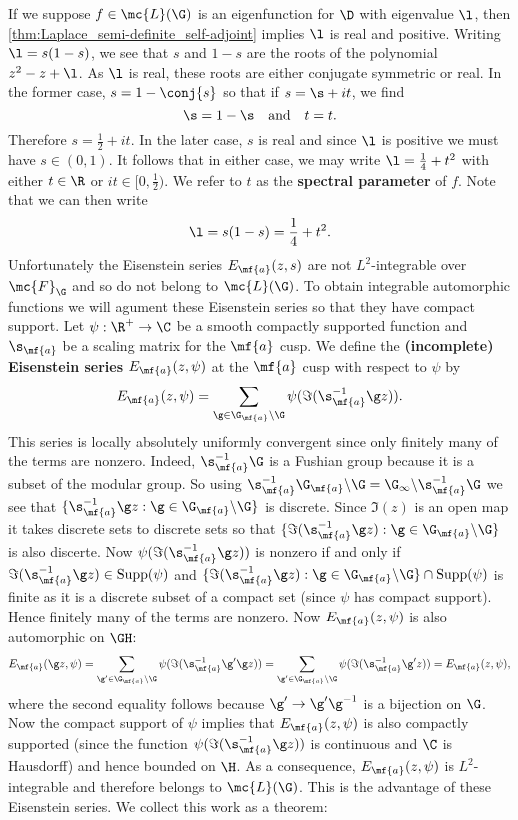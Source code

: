     If we suppose $f \in \mc{L}(\G)$ is an eigenfunction for $\D$ with eigenvalue $\l$, then \cref{thm:Laplace_semi-definite_self-adjoint} implies $\l$ is real and positive. Writing $\l = s(1-s)$, we see that $s$ and $1-s$ are the roots of the polynomial $z^{2}-z+\l$. As $\l$ is real, these roots are either conjugate symmetric or real. In the former case, $s = 1-\conj{s}$ so that if $s = \s+it$, we find
    \[
      \s = 1-\s \quad \text{and} \quad t = t.
    \]
    Therefore $s = \frac{1}{2}+it$. In the later case, $s$ is real and since $\l$ is positive we must have $s \in (0,1)$. It follows that in either case, we may write $\l = \frac{1}{4}+t^{2}$ with either $t \in \R$ or $it \in [0,\frac{1}{2})$. We refer to $t$ as the \textbf{spectral parameter} of $f$. Note that we can then write
    \[
      \l = s(1-s) = \frac{1}{4}+t^{2}.
    \]
    Unfortunately the Eisenstein series $E_{\mf{a}}(z,s)$ are not $L^{2}$-integrable over $\mc{F}_{\G}$ and so do not belong to $\mc{L}(\G)$. To obtain integrable automorphic functions we will agument these Eisenstein series so that they have compact support. Let $\psi:\R^{+} \to \C$ be a smooth compactly supported function and $\s_{\mf{a}}$ be a scaling matrix for the $\mf{a}$ cusp. We define the \textbf{(incomplete) Eisenstein series} $E_{\mf{a}}(z,\psi)$ at the $\mf{a}$ cusp with respect to $\psi$ by
    \[
      E_{\mf{a}}(z,\psi) = \sum_{\g \in \G_{\mf{a}}\backslash\G}\psi(\Im(\s_{\mf{a}}^{-1}\g z)).
    \]
    This series is locally absolutely uniformly convergent since only finitely many of the terms are nonzero. Indeed, $\s_{\mf{a}}^{-1}\G$ is a Fushian group because it is a subset of the modular group. So using $\s_{\mf{a}}^{-1}\G_{\mf{a}}\backslash\G = \G_{\infty}\backslash\s_{\mf{a}}^{-1}\G$ we see that $\{\s_{\mf{a}}^{-1}\g z:\g \in \G_{\mf{a}}\backslash\G\}$ is discrete. Since $\Im(z)$ is an open map it takes discrete sets to discrete sets so that $\{\Im(\s_{\mf{a}}^{-1}\g z):\g \in \G_{\mf{a}}\backslash\G\}$ is also discerte. Now $\psi(\Im(\s_{\mf{a}}^{-1}\g z))$ is nonzero if and only if $\Im(\s_{\mf{a}}^{-1}\g z) \in \mathrm{Supp}(\psi)$ and $\{\Im(\s_{\mf{a}}^{-1}\g z):\g \in \G_{\mf{a}}\backslash\G\} \cap \mathrm{Supp}(\psi)$ is finite as it is a discrete subset of a compact set (since $\psi$ has compact support). Hence finitely many of the terms are nonzero. Now $E_{\mf{a}}(z,\psi)$ is also automorphic on $\GH$:
    \[
      E_{\mf{a}}(\g z,\psi) = \sum_{\g' \in \G_{\mf{a}}\backslash\G}\psi(\Im(\s_{\mf{a}}^{-1}\g'\g z)) = \sum_{\g' \in \G_{\mf{a}}\backslash\G}\psi(\Im(\s_{\mf{a}}^{-1}\g' z)) = E_{\mf{a}}(z,\psi),
    \]
    where the second equality follows because $\g' \to \g'\g^{-1}$ is a bijection on $\G$. Now the compact support of $\psi$ implies that $E_{\mf{a}}(z,\psi)$ is also compactly supported (since the function $\psi(\Im(\s_{\mf{a}}^{-1}\g z))$ is continuous and $\C$ is Hausdorff) and hence bounded on $\H$. As a consequence, $E_{\mf{a}}(z,\psi)$ is $L^{2}$-integrable and therefore belongs to $\mc{L}(\G)$. This is the advantage of these Eisenstein series. We collect this work as a theorem:


